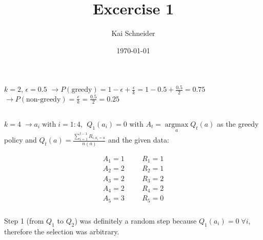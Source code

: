 \documentclass[12pt,a4paper]{article}
\title{Excercise 1}
\author{Kai Schneider}
\date{\today}
\begin{document}
 

\maketitle

\section{}

\subsection{}

$k = 2$, $\epsilon=0.5$ \newline
$\rightarrow P(\textrm{greedy})=1-\epsilon+\frac{\epsilon}{k}=1-0.5+\frac{0.5}{2}=0.75$ \newline
$\rightarrow P(\textrm{non-greedy})=\frac{\epsilon}{k}=\frac{0.5}{2}=0.25$

\subsection{}

$k=4 \; \rightarrow a_{i} \; \textrm{with} \; i=1:4$,  $\; Q_{1}(a_{i})=0$ \newline
with $A_{t}=\underset{a}{\operatorname{argmax}}Q_{t}(a)$ as the greedy policy and 
$Q_{t}(a)=\frac{\sum\limits_{i=1}^{t-1} R_{i,a_{i}=a}}{n(a)}$ and the given data:\newline

\begin{align*}
    A_{1}=1 \;\;\;\;\;\; & R_{1}=1 \\
    A_{2}=2 \;\;\;\;\;\; & R_{2}=1 \\
    A_{3}=2 \;\;\;\;\;\; & R_{3}=2 \\
    A_{4}=2 \;\;\;\;\;\; & R_{4}=2 \\
    A_{5}=3 \;\;\;\;\;\; & R_{5}=0
\end{align*}

\subsubsection{}

Step 1 (from $Q_{1}$ to $Q_{2}$) was definitely a random step because $Q_{1}(a_{i})=0 \; \forall i$, therefore the selection was arbitrary.
\end{document}
